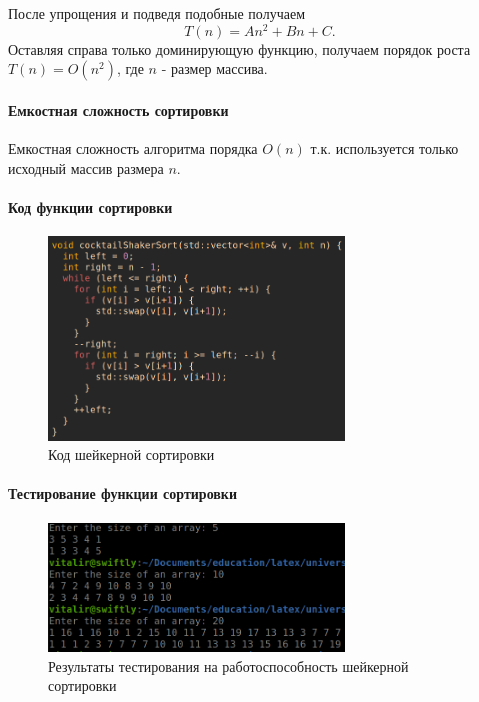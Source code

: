 \documentclass[a4paper, 14pt]{extarticle}
\begin{document}
После упрощения и подведя подобные получаем
\[
  T(n) = An^2+Bn+C
.\]
Оставляя справа только доминирующую функцию, получаем порядок роста
$T(n) = O(n^2)$, где  $n$ - размер массива.

\paragraph{Емкостная сложность сортировки}
Емкостная сложность алгоритма порядка $O(n)$ т.к. используется
только исходный массив размера  $n$.
\paragraph{Код функции сортировки}
\begin{figure}[htpb]
  \centering
  \includegraphics[width=0.7\textwidth]{pictures/second_sort_code.png}
  \caption{Код шейкерной сортировки}
  \label{fig:second_sort_code}
\end{figure}
\paragraph{Тестирование функции сортировки}
\begin{figure}[htpb]
  \centering
  \includegraphics[width=0.7\textwidth]{pictures/second_sort_test.png}
  \caption{Результаты тестирования на работоспособность шейкерной сортировки}
  \label{fig:second_sort_test}
\end{figure}
\newpage
\end{document}
